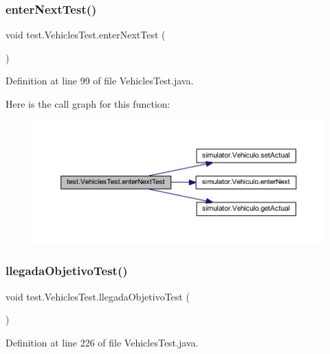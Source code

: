 \subsubsection{\texorpdfstring{enter\+Next\+Test()}{enterNextTest()}}
{\footnotesize\ttfamily void test.\+Vehicles\+Test.\+enter\+Next\+Test (\begin{DoxyParamCaption}{ }\end{DoxyParamCaption})}



Definition at line 99 of file Vehicles\+Test.\+java.

Here is the call graph for this function\+:\nopagebreak
\begin{figure}[H]
\begin{center}
\leavevmode
\includegraphics[width=350pt]{classtest_1_1_vehicles_test_ac7b3dc490a47ed73391a0a95e8b5445c_cgraph}
\end{center}
\end{figure}
\mbox{\label{classtest_1_1_vehicles_test_a34624265089253eb5d45a7fcffeacd90}} 
\subsubsection{\texorpdfstring{llegada\+Objetivo\+Test()}{llegadaObjetivoTest()}}
{\footnotesize\ttfamily void test.\+Vehicles\+Test.\+llegada\+Objetivo\+Test (\begin{DoxyParamCaption}{ }\end{DoxyParamCaption})}



Definition at line 226 of file Vehicles\+Test.\+java.

